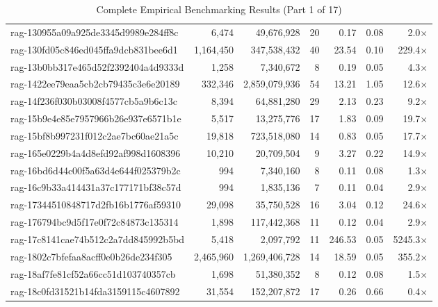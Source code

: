 \begin{table}[h!]
\begin{tabular}{lrrrrrr}
rag-130955a09a925de3345d9989e284ff8c & 6,474 & 49,676,928 & 20 & 0.17 & 0.08 & 2.0$\times$ \\
rag-130fd05c846ed045ffa9dcb831bee6d1 & 1,164,450 & 347,538,432 & 40 & 23.54 & 0.10 & 229.4$\times$ \\
rag-13b0bb317e465d52f2392404a4d9333d & 1,258 & 7,340,672 & 8 & 0.19 & 0.05 & 4.3$\times$ \\
rag-1422ee79eaa5cb2cb79435c3e6e20189 & 332,346 & 2,859,079,936 & 54 & 13.21 & 1.05 & 12.6$\times$ \\
rag-14f236f030b03008f4577cb5a9b6c13c & 8,394 & 64,881,280 & 29 & 2.13 & 0.23 & 9.2$\times$ \\
rag-15b9e4e85e7957966b26e937e6571b1e & 5,517 & 13,275,776 & 17 & 1.83 & 0.09 & 19.7$\times$ \\
rag-15bf8b997231f012c2ae7bc60ae21a5c & 19,818 & 723,518,080 & 14 & 0.83 & 0.05 & 17.7$\times$ \\
rag-165e0229b4a4d8efd92af998d1608396 & 10,210 & 20,709,504 & 9 & 3.27 & 0.22 & 14.9$\times$ \\
rag-16bd6d44c00f5a63d4e644f025379b2c & 994 & 7,340,160 & 8 & 0.11 & 0.08 & 1.3$\times$ \\
rag-16c9b33a414431a37c177171bf38c57d & 994 & 1,835,136 & 7 & 0.11 & 0.04 & 2.9$\times$ \\
rag-17344510848717d2fb16b1776af59310 & 29,098 & 35,750,528 & 16 & 3.04 & 0.12 & 24.6$\times$ \\
rag-176794bc9d5f17e0f72c84873c135314 & 1,898 & 117,442,368 & 11 & 0.12 & 0.04 & 2.9$\times$ \\
rag-17c8141cae74b512c2a7dd845992b5bd & 5,418 & 2,097,792 & 11 & 246.53 & 0.05 & 5245.3$\times$ \\
rag-1802c7bfefaa8acff0e0b26de234f305 & 2,465,960 & 1,269,406,728 & 14 & 18.59 & 0.05 & 355.2$\times$ \\
rag-18af7fe81cf52a66cc51d103740357cb & 1,698 & 51,380,352 & 8 & 0.12 & 0.08 & 1.5$\times$ \\
rag-18c0fd31521b14fda3159115c4607892 & 31,554 & 152,207,872 & 17 & 0.26 & 0.66 & 0.4$\times$ \\
\bottomrule
\end{tabular}
\caption{Complete Empirical Benchmarking Results (Part 1 of 17)}
\end{table}

\clearpage

